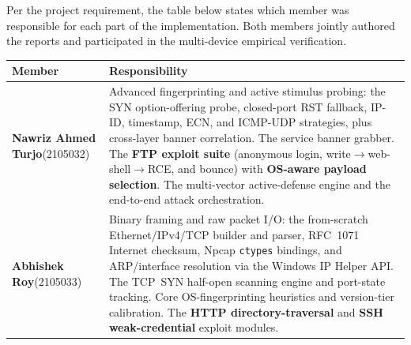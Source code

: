 \documentclass[11pt,a4paper]{article}
\newcommand{\thh}[1]{\textbf{\sffamily #1}}
\newcommand{\hdrrow}{\rowcolor{accentsoft}}
\begin{document}
Per the project requirement, the table below states which member was responsible for each
part of the implementation. Both members jointly authored the reports and participated in
the multi-device empirical verification.

\renewcommand{\arraystretch}{1.3}
\noindent\begin{tabularx}{\textwidth}{@{}L{4.2cm} X@{}}
\toprule
\hdrrow \thh{Member} & \thh{Responsibility}\\
\midrule
\textbf{Nawriz Ahmed Turjo}\newline\small(2105032) &
Advanced fingerprinting and active stimulus probing: the SYN option-offering probe,
closed-port RST fallback, IP-ID, timestamp, ECN, and ICMP-UDP strategies, plus cross-layer
banner correlation. The service banner grabber. The \textbf{FTP exploit suite}
(anonymous login, write$\rightarrow$web-shell$\rightarrow$RCE, and bounce) with
\textbf{OS-aware payload selection}. The multi-vector active-defense engine and the
end-to-end attack orchestration.\\
\addlinespace
\textbf{Abhishek Roy}\newline\small(2105033) &
Binary framing and raw packet I/O: the from-scratch Ethernet/IPv4/TCP builder and
parser, RFC~1071 Internet checksum, Npcap \texttt{ctypes} bindings, and ARP/interface
resolution via the Windows IP Helper API. The TCP~SYN half-open scanning engine and
port-state tracking. Core OS-fingerprinting heuristics and version-tier calibration.
The \textbf{HTTP directory-traversal} and \textbf{SSH weak-credential} exploit modules.\\
\bottomrule
\end{tabularx}
\renewcommand{\arraystretch}{1.0}

\clearpage
\setcounter{tocdepth}{2}
{\hypersetup{linkcolor=ink}\tableofcontents}
\clearpage










\end{document}

